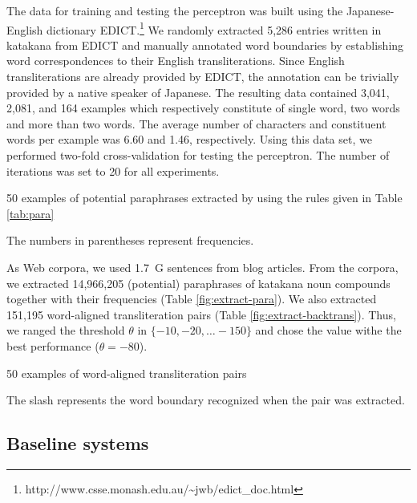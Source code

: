 \documentclass[english]{jnlp_1.4_rep}
\begin{document}
The data for training and testing the perceptron was built using the
Japanese-English dictionary {\sc EDICT}.\footnote{http://www.csse.monash.edu.au/{\textasciitilde}jwb/edict\_doc.html} 
We randomly extracted 5,286 entries written in katakana from EDICT and
manually annotated word boundaries by establishing word correspondences
to their English transliterations. Since English transliterations are
already provided by {\sc EDICT}, the annotation can be trivially
provided by a native speaker of Japanese. The resulting data contained
3,041, 2,081, and 164 examples which respectively constitute of single
word, two words and more than two words. The average number of
characters and constituent words per example was 6.60 and 1.46,
respectively. Using this data set, we performed two-fold cross-validation
for testing the perceptron. The number of iterations was set to 20 for
all experiments.

\begin{table}[b]
\caption{50 examples of potential paraphrases extracted by using the
    rules given in Table \ref{tab:para}}
\label{fig:extract-para}

\small
The numbers in parentheses represent frequencies.\par
\end{table}

As Web corpora, we used 1.7~G sentences from blog articles. From the
corpora, we extracted 14,966,205 (potential) paraphrases of katakana
noun compounds together with their frequencies (Table
\ref{fig:extract-para}). We also extracted 151,195 word-aligned
transliteration pairs (Table \ref{fig:extract-backtrans}). Thus, we
ranged the threshold $\theta$ in $\{-10,-20,\dots-150\}$ and chose the
value withe the best performance ($\theta=-80$).

\begin{table}[t]
\caption{50 examples of word-aligned transliteration pairs}
\label{fig:extract-backtrans}

\vspace{4pt}\small
The slash represents the word boundary recognized when the pair was extracted.
\end{table}


\subsection{Baseline systems}
\label{sec:baseline}
\end{document}
